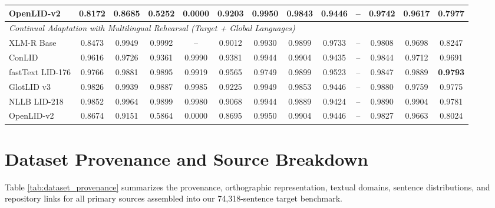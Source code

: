 \documentclass[11pt]{article}
\begin{document}
\begin{table}[p]
{\begin{tabular}{l ccc cccccccc c}
OpenLID-v2         & 0.8172 & 0.8685 & 0.5252 & 0.0000 & 0.9203 & 0.9950 & 0.9843 & 0.9446 & -- & 0.9742 & 0.9617 & 0.7977 \\
\midrule
\multicolumn{13}{l}{\textit{Continual Adaptation with Multilingual Rehearsal (Target + Global Languages)}} \\
XLM-R Base         & 0.8473 & 0.9949 & 0.9992 & -- & 0.9012 & 0.9930 & 0.9899 & 0.9733 & -- & 0.9808 & 0.9698 & 0.8247 \\
ConLID             & 0.9616 & 0.9726 & 0.9361 & 0.9990 & 0.9381 & 0.9944 & 0.9904 & 0.9435 & -- & 0.9844 & 0.9712 & 0.9691 \\
fastText LID-176   & 0.9766 & 0.9881 & 0.9895 & 0.9919 & 0.9565 & 0.9749 & 0.9899 & 0.9523 & -- & 0.9847 & 0.9889 & \textbf{0.9793} \\
GlotLID v3         & 0.9826 & 0.9939 & 0.9887 & 0.9985 & 0.9225 & 0.9949 & 0.9853 & 0.9446 & -- & 0.9880 & 0.9759 & 0.9775 \\
NLLB LID-218       & 0.9852 & 0.9964 & 0.9899 & 0.9980 & 0.9068 & 0.9944 & 0.9889 & 0.9424 & -- & 0.9890 & 0.9904 & 0.9781 \\
OpenLID-v2         & 0.8674 & 0.9151 & 0.5864 & 0.0000 & 0.8695 & 0.9950 & 0.9904 & 0.9446 & -- & 0.9827 & 0.9663 & 0.8024 \\
\bottomrule
\end{tabular}%
}
\end{table}

\section{Dataset Provenance and Source Breakdown}
\label{sec:appendix_data_provenance}

Table \ref{tab:dataset_provenance} summarizes the provenance, orthographic representation, textual domains, sentence distributions, and repository links for all primary sources assembled into our 74,318-sentence target benchmark.
\end{document}
